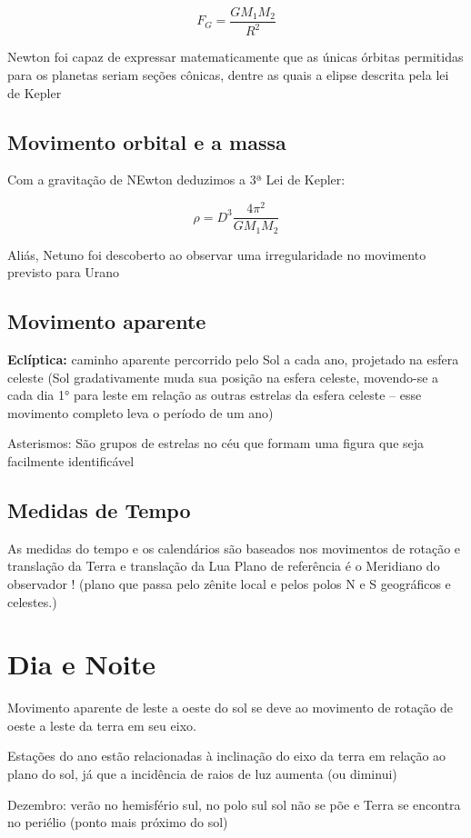 \documentclass{article}
\begin{document}
$$F_G = \frac{GM_1M_2}{R^2}$$

Newton foi capaz de expressar matematicamente que as únicas órbitas 
permitidas para os planetas seriam seções cônicas, dentre as quais 
a elipse descrita pela lei de Kepler

\subsection{Movimento orbital e a massa}

Com a gravitação de NEwton deduzimos a 3ª Lei de Kepler:

$$\rho = D^3 \frac{4\pi^2}{GM_1M_2}$$

Aliás, Netuno foi descoberto ao observar uma irregularidade no
movimento previsto para Urano

\subsection{Movimento aparente}

\textbf{Eclíptica:} caminho aparente percorrido pelo Sol a cada 
ano, projetado na esfera celeste (Sol gradativamente muda sua 
posição na esfera celeste, movendo-se a cada dia 1° para leste 
em relação as outras estrelas da esfera celeste –  esse 
movimento completo leva o período de um ano)

Asterismos: São grupos de estrelas no céu que formam uma 
figura que seja facilmente identificável

\subsection{Medidas de Tempo}

As medidas do tempo e os calendários são baseados nos 
movimentos de rotação e translação da Terra e translação da Lua
Plano de referência é o Meridiano do observador !
(plano que passa pelo zênite local e pelos polos N e S geográficos 
e celestes.)

\section{Dia e Noite}

Movimento aparente de leste a oeste do sol se deve ao movimento de 
rotação de oeste a leste da terra em seu eixo.

Estações do ano estão relacionadas à inclinação do eixo da terra
em relação ao plano do sol, já que a incidência de raios de luz 
aumenta (ou diminui)

Dezembro: verão no hemisfério sul, no polo sul sol não se põe e 
Terra se encontra no periélio (ponto mais próximo do sol)
\end{document}
